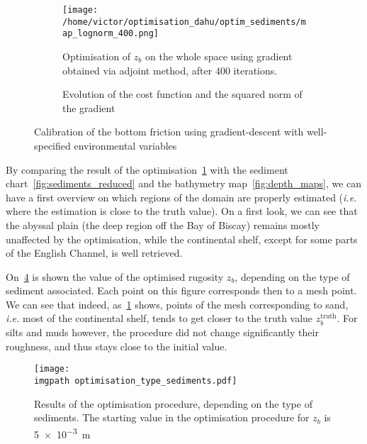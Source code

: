 \documentclass[../../Main_ManuscritThese.tex]{subfiles}
\newcommand{\zob}{z_b}
\newcommand\imgpath{/home/victor/acadwriting/Manuscrit/Text/Chapter5/img/}
\begin{document}
\begin{figure}[ht]
  \begin{subfigure}{\textwidth}
  \centering
  \texttt{[image: /home/victor/optimisation\_dahu/optim\_sediments/map\_lognorm\_400.png]}
  \caption[Optimisation of $\zob$ on the whole
  space]{\label{fig:optimization_map_399} Optimisation of $\zob$ on
    the whole space using gradient obtained via adjoint method, after
    $400$ iterations.}
\end{subfigure}
\begin{subfigure}{\textwidth}
  \centering
  
  \caption{\label{fig:ctrl_true} Evolution of the cost function and
    the squared norm of the gradient}
\end{subfigure}
\caption{Calibration of the bottom friction using gradient-descent
  with well-specified environmental variables}
\end{figure}
By comparing the result of the
optimisation~\cref{fig:optimization_map_399} with the sediment
chart~\cref{fig:sediments_reduced} and the bathymetry
map~\cref{fig:depth_maps}, we can have a first overview on which
regions of the domain are properly estimated (\emph{i.e.} where the
estimation is close to the truth value).  On a first look, we can see
that the abyssal plain (the deep region off the Bay of Biscay) remains
mostly unaffected by the optimisation, while the continental shelf,
except for some parts of the English Channel, is well retrieved.


On~\cref{fig:optimisation_type_sediments} is shown the value of the
optimised rugosity $\zob$, depending on the type of sediment
associated. Each point on this figure corresponds then to a mesh
point.
We can see that indeed, as~\cref{fig:optimization_map_399} shows,
points of the mesh corresponding to sand, \emph{i.e.} most of the
continental shelf, tends to get closer to the truth value
$\zob^{\mathrm{truth}}$. For silts and muds however, the procedure
did not change significantly their roughness, and thus stays close to
the initial value.

\begin{figure}[ht]
  \centering
  \texttt{[image: \\imgpath optimisation\_type\_sediments.pdf]}
  \caption[Final values of the optimisation procedure, based on the
  sediment type]{\label{fig:optimisation_type_sediments} Results of
    the optimisation procedure, depending on the type of
    sediments. The starting value in the optimisation procedure for
    $\zob$ is \SI{5e-3}{\meter}}
\end{figure}
\end{document}
